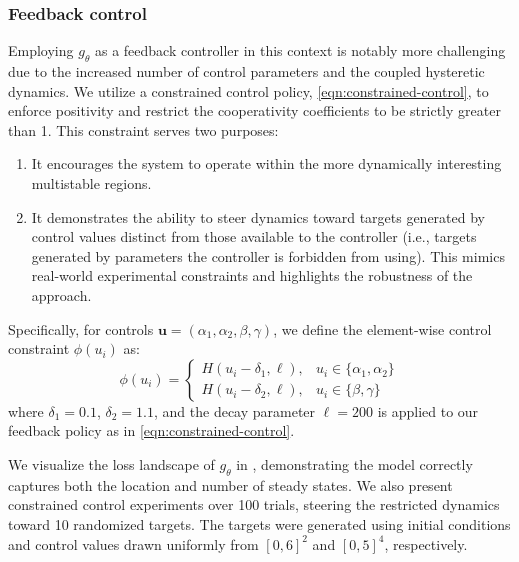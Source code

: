 \documentclass[11pt,twoside]{article}
\theoremstyle{plain}
\theoremstyle{definition}
\theoremstyle{remark}
\newcommand{\vect}[1]{\boldsymbol{#1}}
\begin{document}
\subsubsection*{Feedback control}
Employing \(g_\theta\) as a feedback controller in this context is notably more challenging due to the increased number of control parameters and the coupled hysteretic dynamics. We utilize a constrained control policy, \cref{eqn:constrained-control}, to enforce positivity and restrict the cooperativity coefficients to be strictly greater than 1. This constraint serves two purposes:

\begin{enumerate}
    \item It encourages the system to operate within the more dynamically interesting multistable regions.
    \item It demonstrates the ability to steer dynamics toward targets generated by control values distinct from those available to the controller (i.e., targets generated by parameters the controller is forbidden from using). This mimics real-world experimental constraints and highlights the robustness of the approach.
\end{enumerate}

Specifically, for controls $\vect{u} = (\alpha_1, \alpha_2, \beta, \gamma)$, we define the element-wise control constraint $\phi(u_i)$ as:
\begin{equation}
    \phi(u_i) = 
    \begin{cases} 
        H(u_i - \delta_1, \ell), & u_i \in \{\alpha_1, \alpha_2\} \\
        H(u_i - \delta_2, \ell), &  u_i \in \{\beta, \gamma\}
    \end{cases}
    \label{eqn:toggle-control-constraint}
\end{equation}
where $\delta_1 = 0.1$, $\delta_2 = 1.1$, and the decay parameter $\ell = 200$ is applied to our feedback policy as in \cref{eqn:constrained-control}.


We visualize the loss landscape of \(g_\theta\) in , demonstrating the model correctly captures both the location and number of steady states. We also present constrained control experiments over 100 trials, steering the restricted dynamics toward 10 randomized targets. The targets were generated using initial conditions and control values drawn uniformly from \([0,6]^2\) and \([0,5]^4\), respectively. 
\end{document}
